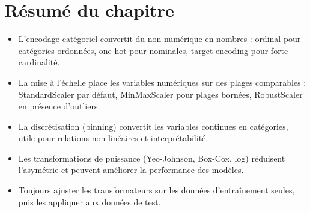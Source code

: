 \section{R\'esum\'e du chapitre}

\begin{itemize}
  \item L'encodage cat\'egoriel convertit du non-num\'erique en nombres : ordinal pour cat\'egories ordonn\'ees, one-hot pour nominales, target encoding pour forte cardinalit\'e.
  \item La mise \`a l'\'echelle place les variables num\'eriques sur des plages comparables : StandardScaler par d\'efaut, MinMaxScaler pour plages born\'ees, RobustScaler en pr\'esence d'outliers.
  \item La discr\'etisation (binning) convertit les variables continues en cat\'egories, utile pour relations non lin\'eaires et interpr\'etabilit\'e.
  \item Les transformations de puissance (Yeo-Johnson, Box-Cox, log) r\'eduisent l'asym\'etrie et peuvent am\'eliorer la performance des mod\`eles.
  \item Toujours ajuster les transformateurs sur les donn\'ees d'entra\^inement seules, puis les appliquer aux donn\'ees de test.
\end{itemize}
